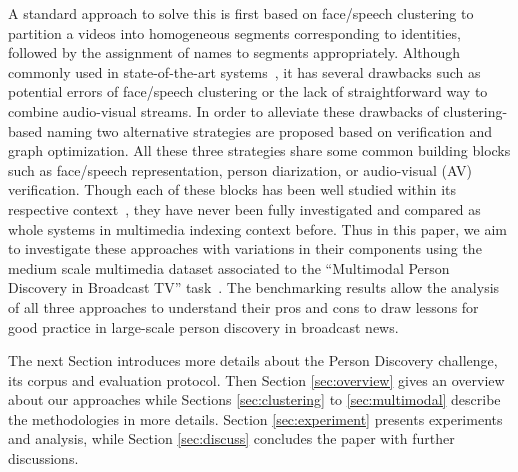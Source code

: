 A standard approach to solve this is first based on face/speech clustering to partition a videos into homogeneous segments corresponding to identities, followed by the assignment of names to segments appropriately.
%
Although commonly used in state-of-the-art systems~\cite{le2015eumssi,poignant2012fusion}, it has several drawbacks such as potential errors of face/speech clustering or the lack of straightforward way to combine audio-visual streams.
%
In order to alleviate these drawbacks of clustering-based naming %
two alternative strategies are proposed based on verification and graph optimization. 
%
All these three strategies share some common building blocks such as face/speech representation, person diarization, or audio-visual (AV) verification. Though each of these blocks has been well studied within its respective context~\cite{parkhi15deep,wallace2012total,Schroff2015,Ben},
%
they have never been fully investigated and compared as whole systems in multimedia indexing context before. 
%
Thus in this paper, we  aim to investigate these approaches with variations in their components using the medium  scale multimedia dataset associated to the ``Multimodal Person Discovery in Broadcast TV'' task~\cite{POIGNANT--MEDIAEVAL--2015,bredin2016mediaeval}.
%
The benchmarking results allow the analysis of all three approaches to understand their pros and cons to draw lessons for good practice in large-scale person discovery in broadcast news.

The next Section introduces more details about the Person Discovery challenge, its corpus and evaluation protocol.
Then Section \ref{sec:overview} gives an overview about our approaches while Sections \ref{sec:clustering} to \ref{sec:multimodal}
 describe the methodologies in more details.
Section \ref{sec:experiment} presents experiments and analysis, while 
Section \ref{sec:discuss} concludes the paper 
with further discussions.

\endinput
